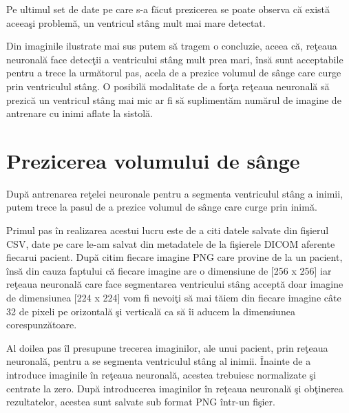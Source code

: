 Pe ultimul set de date pe care s-a f\u{a}cut prezicerea se poate observa c\u{a} exist\u{a} aceea\c{s}i problem\u{a}, un ventricul st\^{a}ng mult mai mare detectat.

\par

Din imaginile ilustrate mai sus putem s\u{a} tragem o concluzie, aceea c\u{a}, re\c{t}eaua neuronal\u{a} face detec\c{t}ii a ventricului st\^{a}ng mult prea mari, \^{i}ns\u{a} sunt acceptabile pentru a trece la urm\u{a}torul pas, acela de a prezice volumul de s\^{a}nge care curge prin ventriculul st\^{a}ng. O posibil\u{a} modalitate de a for\c{t}a re\c{t}eaua neuronal\u{a} s\u{a} prezic\u{a} un ventricul st\^{a}ng mai mic ar fi s\u{a} supliment\u{a}m num\u{a}rul de imagine de antrenare cu inimi aflate la sistol\u{a}.

\section{Prezicerea volumului de s\^{a}nge}

Dup\u{a} antrenarea re\c{t}elei neuronale pentru a segmenta ventriculul st\^{a}ng a inimii, putem trece la pasul de a prezice volumul de s\^{a}nge care curge prin inim\u{a}.

\par

Primul pas \^{i}n realizarea acestui lucru este de a citi datele salvate din fi\c{s}ierul CSV, date pe care le-am salvat din metadatele de la fi\c{s}ierele DICOM aferente fiecarui pacient. Dup\u{a} citim fiecare imagine PNG care provine de la un pacient, \^{i}ns\u{a} din cauza faptului c\u{a} fiecare imagine are o dimensiune de [256 x 256] iar re\c{t}eaua neuronal\u{a} care face segmentarea ventricului st\^{a}ng accept\u{a} doar imagine de dimensiunea [224 x 224] vom fi nevoi\c{t}i s\u{a} mai t\u{a}iem din fiecare imagine c\^{a}te 32 de pixeli pe orizontal\u{a} \c{s}i vertical\u{a} ca s\u{a} \^{i}i aducem la dimensiunea corespunz\u{a}toare.

\par

Al doilea pas \^{i}l presupune trecerea imaginilor, ale unui pacient, prin re\c{t}eaua neuronal\u{a}, pentru a se segmenta ventriculul st\^{a}ng al inimii. \^{I}nainte de a introduce imaginile \^{i}n re\c{t}eaua neuronal\u{a}, acestea trebuiesc normalizate \c{s}i centrate la zero. Dup\u{a} introducerea imaginilor \^{i}n re\c{t}eaua neuronal\u{a} \c{s}i ob\c{t}inerea rezultatelor, acestea sunt salvate sub format PNG \^{i}ntr-un fi\c{s}ier.

